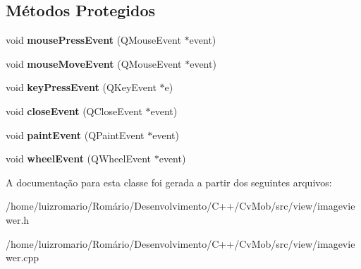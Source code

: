 \subsection*{Métodos Protegidos}
\begin{DoxyCompactItemize}
\item 
\hypertarget{classimageViewer_ae192d62e031013eb33565dc0cf4e0c48}{
void {\bfseries mousePressEvent} (QMouseEvent $\ast$event)}
\label{classimageViewer_ae192d62e031013eb33565dc0cf4e0c48}

\item 
\hypertarget{classimageViewer_a751e6a74b4a3b537e22d7ec1b21b5e08}{
void {\bfseries mouseMoveEvent} (QMouseEvent $\ast$event)}
\label{classimageViewer_a751e6a74b4a3b537e22d7ec1b21b5e08}

\item 
\hypertarget{classimageViewer_a8791119b74e7d7933406c4793ee01e6a}{
void {\bfseries keyPressEvent} (QKeyEvent $\ast$e)}
\label{classimageViewer_a8791119b74e7d7933406c4793ee01e6a}

\item 
\hypertarget{classimageViewer_aa1ae43c486ad1d68c508ca8d10d52018}{
void {\bfseries closeEvent} (QCloseEvent $\ast$event)}
\label{classimageViewer_aa1ae43c486ad1d68c508ca8d10d52018}

\item 
\hypertarget{classimageViewer_acbc39588ff386cbfc8962d3a2a57b5d4}{
void {\bfseries paintEvent} (QPaintEvent $\ast$event)}
\label{classimageViewer_acbc39588ff386cbfc8962d3a2a57b5d4}

\item 
\hypertarget{classimageViewer_a02b850eb75c7be90df19fcf4d3031039}{
void {\bfseries wheelEvent} (QWheelEvent $\ast$event)}
\label{classimageViewer_a02b850eb75c7be90df19fcf4d3031039}

\end{DoxyCompactItemize}


A documentação para esta classe foi gerada a partir dos seguintes arquivos:\begin{DoxyCompactItemize}
\item 
/home/luizromario/Romário/Desenvolvimento/C++/CvMob/src/view/imageviewer.h\item 
/home/luizromario/Romário/Desenvolvimento/C++/CvMob/src/view/imageviewer.cpp\end{DoxyCompactItemize}
